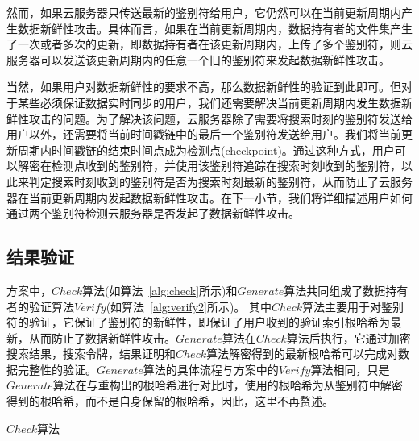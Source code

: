 然而，如果云服务器只传送最新的鉴别符给用户，它仍然可以在当前更新周期内产生数据新鲜性攻击。具体而言，如果在当前更新周期内，数据持有者的文件集产生了一次或者多次的更新，即数据持有者在该更新周期内，上传了多个鉴别符，则云服务器可以发送该更新周期内的任意一个旧的鉴别符来发起数据新鲜性攻击。

当然，如果用户对数据新鲜性的要求不高，那么数据新鲜性的验证到此即可。但对于某些必须保证数据实时同步的用户，我们还需要解决当前更新周期内发生数据新鲜性攻击的问题。为了解决该问题，云服务器除了需要将搜索时刻的鉴别符发送给用户以外，还需要将当前时间戳链中的最后一个鉴别符发送给用户。我们将当前更新周期内时间戳链的结束时间点成为检测点(checkpoint)。通过这种方式，用户可以解密在检测点收到的鉴别符，并使用该鉴别符追踪在搜索时刻收到的鉴别符，以此来判定搜索时刻收到的鉴别符是否为搜索时刻最新的鉴别符，从而防止了云服务器在当前更新周期内发起数据新鲜性攻击。在下一小节，我们将详细描述用户如何通过两个鉴别符检测云服务器是否发起了数据新鲜性攻击。


\subsection{结果验证}
\multi 方案中，$Check$算法(如算法~\ref{alg:check}所示)和$Generate$算法共同组成了数据持有者的验证算法$Verify$(如算法~\ref{alg:verify2}所示)。
其中$Check$算法主要用于对鉴别符的验证，它保证了鉴别符的新鲜性，即保证了用户收到的验证索引根哈希为最新，从而防止了数据新鲜性攻击。$Generate$算法在$Check$算法后执行，它通过加密搜索结果，搜索令牌，结果证明和$Check$算法解密得到的最新根哈希可以完成对数据完整性的验证。$Generate$算法的具体流程与\single 方案中的$Verify$算法相同，只是$Generate$算法在与重构出的根哈希进行对比时，使用的根哈希为从鉴别符中解密得到的根哈希，而不是自身保留的根哈希，因此，这里不再赘述。

\begin{algorithm}[h]
  \caption{$Check$算法}
  \label{alg:check}
  \begin{algorithmic}[1]
              \ENDIF
              \ENDIF
                    \ENDIF
              \ENDFOR
              \ELSE
              \ENDIF
  \end{algorithmic}
\end{algorithm}

